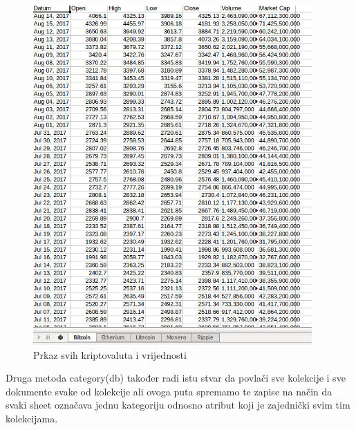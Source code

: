 \documentclass[a4paper,12pt]{foi}
\begin{document}
\begin{figure}[h]
\centering 
\includegraphics[width=0.95\textwidth]{coinovi.png}
\caption{Prkaz svih kriptovaluta i vrijednosti}
\label{slika-5}
\end{figure}


Druga metoda category(db) također radi istu stvar da povlači sve kolekcije i sve dokumente svake od kolekcije ali ovoga puta spremamo te zapise na način da svaki sheet označava jednu kategoriju odnosno atribut koji je zajednički svim tim kolekcijama.
\end{document}
